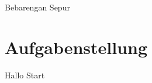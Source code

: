 \documentclass[a4paper, 12pt]{scrartcl}
\begin{document}
    \begin{titlepage}
        \begin{center}
            \large {Bebarengan Sepur}
        \end{center}
    \end{titlepage}

    
    \section{Aufgabenstellung}
    Hallo Start
\end{document}
